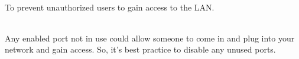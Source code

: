 \documentclass[../EngineeringJournal_CDavis.tex]{subfiles}
\begin{document}

\\
To prevent unauthorized users to gain access to the LAN.


\noindent{}\\
Any enabled port not in use could allow someone to come in and plug into
your network and gain access. So, it's best practice to disable any unused
ports.

\end{document}
